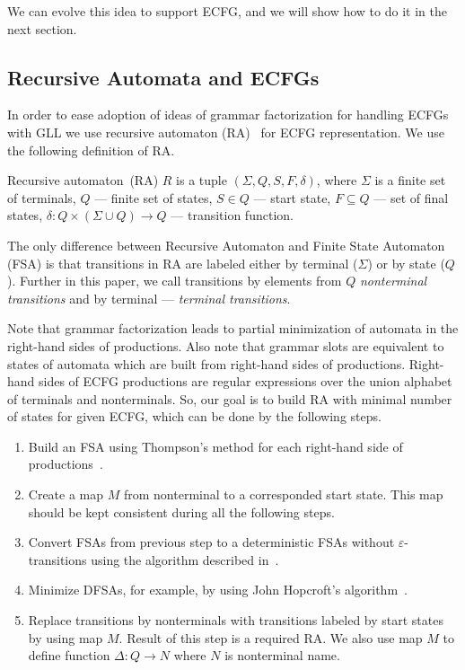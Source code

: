 \documentclass[runningheads,a4paper]{llncs}
\begin{document}
We can evolve this idea to support ECFG, and we will show how to do it in the next section.

\subsection{Recursive Automata and ECFGs}

In order to ease adoption of ideas of grammar factorization for handling ECFGs with GLL we use recursive automaton (RA)~\cite{tellier2006learning} for ECFG representation.
We use the following definition of RA.

\begin{mydef}
    Recursive automaton~(RA) $R$ is a tuple $(\Sigma, Q, S, F, \delta)$, where $\Sigma$ is a finite set of terminals, $Q$ --- finite set of states, $S \in Q$ --- start state, $F \subseteq Q$ --- set of final states, $\delta : Q \times (\Sigma \cup Q) \to Q$ --- transition function.
\end{mydef}

The only difference between Recursive Automaton and Finite State Automaton (FSA) is that transitions in RA are labeled either by terminal ($\Sigma$) or by state ($Q$).
Further in this paper, we call transitions by elements from $Q$ \textit{nonterminal transitions} and by terminal --- \textit{terminal transitions}.

Note that grammar factorization leads to partial minimization of automata in the right-hand sides of productions.
Also note that grammar slots are equivalent to states of automata which are built from right-hand sides of productions.
Right-hand sides of ECFG productions are regular expressions over the union alphabet of terminals and nonterminals.
So, our goal is to build RA with minimal number of states for given ECFG, which can be done by the following steps.
\begin{enumerate} 
\item Build an FSA using Thompson's method for each right-hand side of productions~\cite{Thompson:1968:PTR:363347.363387}.
\item Create a map $M$ from nonterminal to a corresponded start state.
This map should be kept consistent during all the following steps. 
\item Convert FSAs from previous step to a deterministic FSAs without $\varepsilon$-transitions using the algorithm described in~\cite{aho1974design}.
\item Minimize DFSAs, for example, by using John Hopcroft's algorithm~\cite{hopcroft1971n}.
\item Replace transitions by nonterminals with transitions labeled by start states by using map $M$.
Result of this step is a required RA. We also use map $M$ to define function $\Delta : Q \to N$ where $N$ is nonterminal name.
\end{enumerate}
\end{document}
